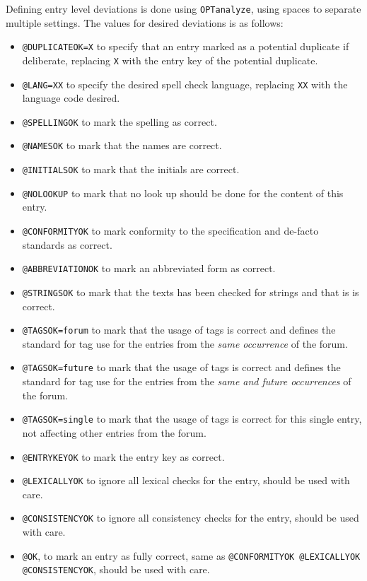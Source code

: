 Defining entry level deviations is done using \texttt{OPTanalyze},
using spaces to separate multiple settings.  The values for desired
deviations is as follows:

\begin{itemize}
\item \texttt{@DUPLICATEOK=X} to specify that an entry marked as a
  potential duplicate if deliberate, replacing \texttt{X} with the
  entry key of the potential duplicate.
\item \texttt{@LANG=XX} to specify the desired spell check language,
  replacing \texttt{XX} with the language code desired.
\item \texttt{@SPELLINGOK} to mark the spelling as correct.
\item \texttt{@NAMESOK} to mark that the names are correct.
\item \texttt{@INITIALSOK} to mark that the initials are correct.
\item \texttt{@NOLOOKUP} to mark that no look up should be done for
  the content of this entry.
\item \texttt{@CONFORMITYOK} to mark conformity to the specification
  and de-facto standards as correct.
\item \texttt{@ABBREVIATIONOK} to mark an abbreviated form as correct.
\item \texttt{@STRINGSOK} to mark that the texts has been checked for
  strings and that is is correct.
\item \texttt{@TAGSOK=forum} to mark that the usage of tags is correct and
  defines the standard for tag use for the entries from the \emph{same
  occurrence} of the forum.
\item \texttt{@TAGSOK=future} to mark that the usage of tags is
  correct and defines the standard for tag use for the entries from
  the \emph{same and future occurrences} of the forum.
\item \texttt{@TAGSOK=single} to mark that the usage of tags is
  correct for this single entry, not affecting other entries from the
  forum.
\item \texttt{@ENTRYKEYOK} to mark the entry key as correct.
\item \texttt{@LEXICALLYOK} to ignore all lexical checks for the
  entry, should be used with care.
\item \texttt{@CONSISTENCYOK} to ignore all consistency checks for the
  entry, should be used with care.
\item \texttt{@OK}, to mark an entry as fully correct, same as
  \texttt{@CONFORMITYOK @LEXICALLYOK @CONSISTENCYOK}, should be used
  with care.
\end{itemize}

